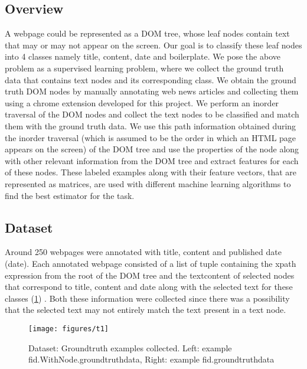 \documentclass{article} %
\begin{document}
\subsection{Overview}
A webpage could be represented as a DOM tree, whose leaf nodes contain text that may or may not appear on the screen. Our goal is to classify these leaf nodes into 4 classes namely title, content, date and boilerplate. We pose the above problem as a supervised learning problem, where we collect the ground truth data that contains text nodes and its corresponding class. We obtain the ground truth DOM nodes by manually annotating web news articles and collecting them using a chrome extension developed for this project. We perform an inorder traversal of the DOM nodes and collect the text nodes to be classified and match them with the ground truth data. We use this path information obtained during the inorder traversal (which is assumed to be the order in which an HTML page appears on the screen) of the DOM tree and use the properties of the node along with other relevant information from the DOM tree and extract features for each of these nodes. These labeled examples along with their feature vectors, that are represented as matrices, are used with different machine learning algorithms to find the best estimator for the task. \\

\subsection{Dataset}
Around 250 webpages were annotated with title, content and published date (date). Each annotated webpage consisted of a list of tuple containing the xpath expression from the root of the DOM tree and the textcontent of selected nodes that correspond to title, content and date along with the selected text for these classes (\ref{fig:dataset}) . Both these information were collected since there was a possibility that the selected text may not entirely match the text present in a text node. 

\begin{figure}[h]
\begin{center}
\texttt{[image: figures/t1]}
\end{center}
\caption{Dataset: Groundtruth examples collected. Left: example fid.WithNode.groundtruthdata, Right: example fid.groundtruthdata}\label{fig:dataset}
\end{figure}
\end{document}
